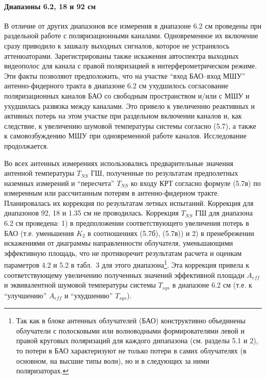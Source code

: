 \paragraph{Диапазоны 6.2, 18 и 92 см}

В отличие от других диапазонов все измерения в диапазоне 6.2 см проведены
при раздельной работе с поляризационными каналами.
Одновременное их включение сразу приводило к зашкалу выходных сигналов,
которое не устранялось аттенюаторами.
Зарегистрированы также искажения автоспектра выходных видеополос для
канала с правой поляризацией в интерферометрическом режиме. Эти
факты позволяют предположить, что на участке ``вход БАО--вход МШУ''
антенно-фидерного тракта в диапазоне 6.2 см ухудшилось согласование
поляризационных каналов БАО со свободным пространством и/или с МШУ и
ухудшилась развязка между каналами.
Это привело к увеличению реактивных и активных потерь на
этом участке при раздельном включении каналов и, как следствие, к
увеличению шумовой температуры системы согласно (5.7), а также к
самовозбуждению МШУ при одновременной работе каналов.
Исследование продолжается.

Во всех антенных измерениях использовались предварительные значения антенной
температуры $T_{NS}$ ГШ, полученные по результатам предполетных наземных измерений
и ``пересчета'' $T_{NS}$ ко входу КРТ согласно формуле (5.7в)
по измеренным или рассчитанным потерям  \cite{}
в антенно-фидерном тракте.
Планировалась их коррекция по результатам летных испытаний.
Коррекция для диапазонов 92, 18 и 1.35 см не проводилась.
Коррекция $T_{NS}$ ГШ для диапазона 6.2 см проведена:
1) в предположении соответствующего увеличения потерь в БАО
(т.е. уменьшения $K_2$ в соотношениях (5.7б), (5.7в)) и
2) в пренебрежении искажениями от
диаграммы направленности облучателя, уменьшающими эффективную площадь,
что не противоречит результатам расчета  \cite{}
и оценкам параметров
4.2 и 5.2 в табл.~3 для этого диапазона\footnote
{Так как в блоке антенных облучателей (БАО) конструктивно объединены
облучатели с полосковыми или волноводными формирователями
левой и правой круговых поляризаций для каждого дипапазона
(см. разделы 5.1 и  2), то потери в БАО характеризуют
не только потери в самих облучателях (в основном, на высшие типы волн), но
и в следующих за ними поляризаторах.
}.
Эта коррекция привела к соответствующему увеличению полученных значений
эффективной площади $A_{eff}$ и эквивалентной шумовой температуры системы
$T_{sys}$ в диапазоне 6.2 см (т.е. к ``улучшению'' $A_{eff}$ и ``ухудшению''
$T_{sys}$).


